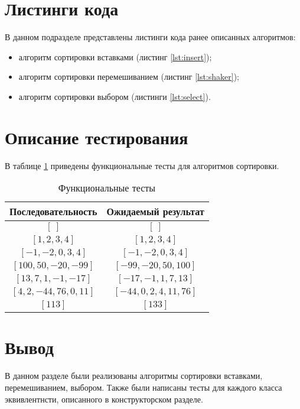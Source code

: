 \section{Листинги кода}

В данном подразделе представлены листинги кода ранее описанных алгоритмов:
\begin{itemize}[left=\parindent]
    \item алгоритм сортировки вставками (листинг \ref{lst:insert});
    \item алгоритм сортировки перемешиванием (листинг \ref{lst:shaker});
    \item алгоритм сортировки выбором (листинги \ref{lst:select}).
\end{itemize}


\section{Описание тестирования}

В таблице \ref{tab:tests} приведены функциональные тесты для алгоритмов
сортировки.

\begin{table}[h!]
	\begin{center}
    \begin{threeparttable}
        \captionsetup{justification=raggedright,singlelinecheck=off}
        \caption{\label{tab:tests}Функциональные тесты}
        \begin{tabular}{|c|c|}
			\hline
            \textbf{Последовательность} & \textbf{Ожидаемый результат} \\ [2mm]
            \hline
            $[~]$
            &
            $[~]$
            \\
            \hline
            $[1, 2, 3, 4]$
            &
            $[1, 2, 3, 4]$
            \\
            \hline
            $[-1, -2, 0, 3, 4]$
            &
            $[-1, -2, 0, 3, 4]$
            \\
            \hline
            $[100, 50, -20, -99]$
            &
            $[-99, -20, 50, 100]$
            \\
            \hline
            $[13, 7, 1, -1, -17]$
            &
            $[-17, -1, 1, 7, 13]$
            \\
            \hline
            $[4, 2, -44, 76, 0, 11]$
            &
            $[-44, 0, 2, 4, 11, 76]$
            \\
            \hline
            $[113]$
            &
            $[133]$
            \\
            \hline
		\end{tabular}
    \end{threeparttable} 
	\end{center}
\end{table}

\section{Вывод}

В данном разделе были реализованы алгоритмы сортировки вставками, перемешиванием, выбором. Также были написаны тесты для каждого класса эквивлентнсти, описанного в конструкторском разделе.
